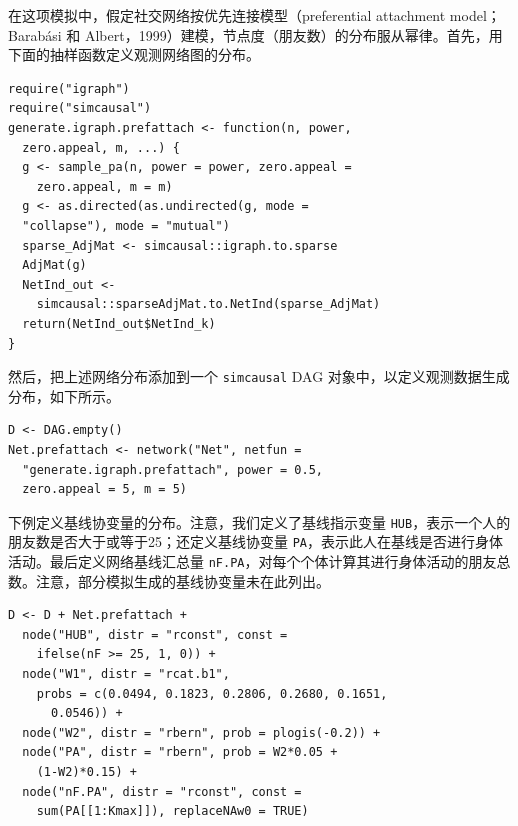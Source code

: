 在这项模拟中，假定社交网络按优先连接模型（preferential attachment model；Barabási 和 Albert，1999）建模，节点度（朋友数）的分布服从幂律。首先，用下面的抽样函数定义观测网络图的分布。
\par\noindent\begin{minipage}{\linewidth}
\begin{lstlisting}[numbers=none,frame=none]
require("igraph")
require("simcausal")
generate.igraph.prefattach <- function(n, power,
  zero.appeal, m, ...) {
  g <- sample_pa(n, power = power, zero.appeal =
    zero.appeal, m = m)
  g <- as.directed(as.undirected(g, mode =
  "collapse"), mode = "mutual")
  sparse_AdjMat <- simcausal::igraph.to.sparse
  AdjMat(g)
  NetInd_out <-
    simcausal::sparseAdjMat.to.NetInd(sparse_AdjMat)
  return(NetInd_out$NetInd_k)
}
\end{lstlisting}
\end{minipage}\par
然后，把上述网络分布添加到一个 \texttt{simcausal} DAG 对象中，以定义观测数据生成分布，如下所示。
\par\noindent\begin{minipage}{\linewidth}
\begin{lstlisting}[numbers=none,frame=none]
D <- DAG.empty()
Net.prefattach <- network("Net", netfun =
  "generate.igraph.prefattach", power = 0.5,
  zero.appeal = 5, m = 5)
\end{lstlisting}
\end{minipage}\par
下例定义基线协变量的分布。注意，我们定义了基线指示变量 \texttt{HUB}，表示一个人的朋友数是否大于或等于25；还定义基线协变量 \texttt{PA}，表示此人在基线是否进行身体活动。最后定义网络基线汇总量 \texttt{nF.PA}，对每个个体计算其进行身体活动的朋友总数。注意，部分模拟生成的基线协变量未在此列出。
\par\noindent\begin{minipage}{\linewidth}
\begin{lstlisting}[numbers=none,frame=none]
D <- D + Net.prefattach +
  node("HUB", distr = "rconst", const =
    ifelse(nF >= 25, 1, 0)) +
  node("W1", distr = "rcat.b1",
    probs = c(0.0494, 0.1823, 0.2806, 0.2680, 0.1651,
      0.0546)) +
  node("W2", distr = "rbern", prob = plogis(-0.2)) +
  node("PA", distr = "rbern", prob = W2*0.05 +
    (1-W2)*0.15) +
  node("nF.PA", distr = "rconst", const =
    sum(PA[[1:Kmax]]), replaceNAw0 = TRUE)
\end{lstlisting}
\end{minipage}\par
